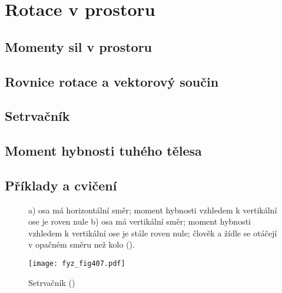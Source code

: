 \setchaptertoc
\chapter{Rotace v prostoru}\label{fyz:IchapXX}

  \section{Momenty sil v prostoru}\label{fyz:IchapXXsecI}
  \section{Rovnice rotace a vektorový součin}\label{fyz:IchapXXsecII}
  \section{Setrvačník}\label{fyz:IchapXXsecIII}
  \section{Moment hybnosti tuhého tělesa}\label{fyz:IchapXXsecIV}
  \section{Příklady a cvičení}\label{fyz:IchapXXsecV}  

  \begin{figure}[ht!] %
    \centering
    \caption{a) osa má horizontální směr; moment hybnosti vzhledem k vertikální ose je roven nule 
             b) osa má vertikální směr; moment hybnosti vzhledem k vertikální ose je stále roven 
             nule; člověk a žídle se otáčejí v opačném směru než kolo
             (\cite[s.~278]{Feynman01}).}
    \label{fyz:fig406}
  \end{figure}

  \begin{figure}[ht!] %
    \centering
    \texttt{[image: fyz\_fig407.pdf]}
    \caption{Setrvačník
             (\cite[s.~279]{Feynman01})}
    \label{fyz:fig407}
  \end{figure}

